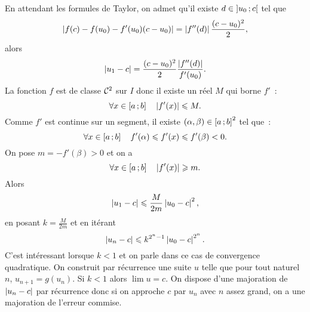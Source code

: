 En attendant les formules de Taylor, on admet qu'il existe \(d \in \left] u_0 \, ;  c \right[\) tel que
\begin{equation}
  \left\lvert f(c)-f(u_0)-f'(u_0)(c-u_0)\right\rvert = \left\lvert f''(d)\right\rvert\frac{(c-u_0)^2}{2},
\end{equation}
alors
\begin{equation}
  \left\lvert u_1-c\right\rvert = \frac{(c-u_0)^2}{2} \frac{\left\lvert f''(d)\right\rvert}{f'(u_0)}.
\end{equation}
La fonction \(f\) est de classe \(\mathcal{C}^{2}\) sur \(I\) donc il existe un réel \(M\) qui borne \(f'\)~:
\begin{equation}
  \forall x \in \left[ a \, ;  b \right] \quad \left\lvert f'(x)\right\rvert \leqslant M.
\end{equation}
Comme \(f'\) est continue sur un segment, il existe \((\alpha,\beta) \in \left[ a \, ;  b \right]^2\) tel que~:
\begin{equation}
  \forall x \in \left[ a \, ;  b \right] \quad f'(\alpha) \leqslant f'(x) \leqslant f'(\beta) <0.
\end{equation}
On pose \(m=-f'(\beta)>0\) et on a
\begin{equation}
  \forall x \in \left[ a \, ;  b \right] \quad \left\lvert f'(x)\right\rvert \geqslant m.
\end{equation}
Alors
\begin{equation}
  \left\lvert u_1-c\right\rvert \leqslant \frac{M}{2m} \left\lvert u_0-c\right\rvert^2,
\end{equation}
en posant \(k=\frac{M}{2m}\) et en itérant
\begin{equation}
  \left\lvert u_n-c\right\rvert \leqslant k^{2^n-1} \left\lvert u_0-c\right\rvert^{2^n}.
\end{equation}
C'est intéressant lorsque \(k < 1\) et on parle dans ce cas de convergence quadratique. On construit par récurrence une suite \(u\) telle que pour tout naturel \(n\), \(u_{n+1}=g(u_n)\). Si \(k<1\) alors \(\lim u =c\). On dispose d'une majoration de \(\left\lvert u_n-c\right\rvert\) par récurrence donc si on approche \(c\) par \(u_n\) avec \(n\) assez grand, on a une majoration de l'erreur commise.

